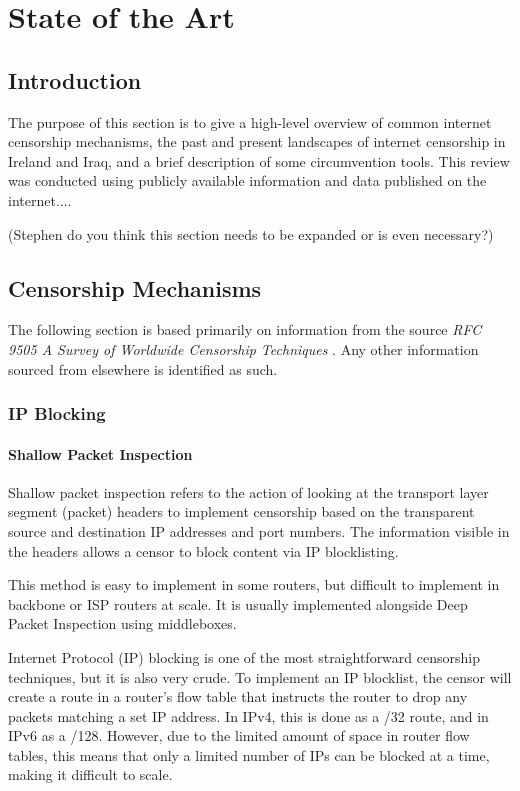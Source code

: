 \chapter{State of the Art}

\section{Introduction}

The purpose of this section is to give a high-level overview of common internet censorship mechanisms, the past and present landscapes of internet censorship in Ireland and Iraq, and a brief description of some circumvention tools. This review was conducted using publicly available information and data published on the internet....

(Stephen do you think this section needs to be expanded or is even necessary?)

\section{Censorship Mechanisms}

The following section is based primarily on information from the source \textit{RFC 9505
A Survey of Worldwide Censorship Techniques} \cite{rfc9505}. Any other information sourced from elsewhere is identified as such.

\subsection{IP Blocking}

\subsubsection{Shallow Packet Inspection}

Shallow packet inspection refers to the action of looking at the transport layer segment (packet) headers to implement censorship based on the transparent source and destination IP addresses and port numbers. The information visible in the headers allows a censor to block content via IP blocklisting.

This method is easy to implement in some routers, but difficult to implement in backbone or ISP routers at scale. It is usually implemented alongside Deep Packet Inspection using middleboxes.

Internet Protocol (IP) blocking is one of the most straightforward censorship techniques, but it is also very crude. To implement an IP blocklist, the censor will create a route in a router's flow table that instructs the router to drop any packets matching a set IP address. In IPv4, this is done as a /32 route, and in IPv6 as a /128. However, due to the limited amount of space in router flow tables, this means that only a limited number of IPs can be blocked at a time, making it difficult to scale.


